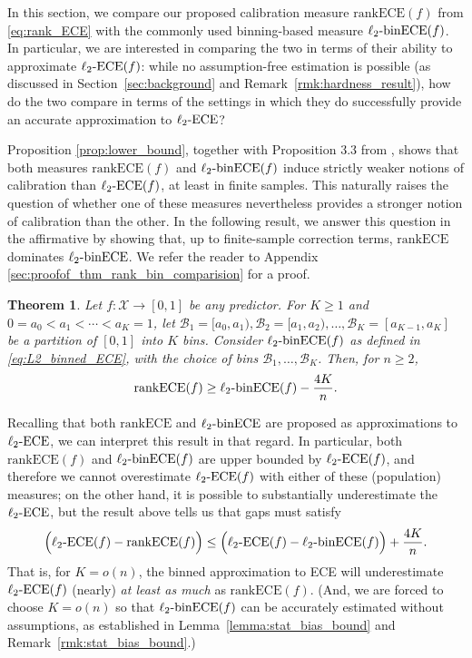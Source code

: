 \documentclass[11pt]{article}
\numberwithin{equation}{section}
\newtheorem{theorem}{Theorem}[section]
\theoremstyle{definition}
\newcommand{\cB}{\mathcal{B}}
\newcommand{\cX}{\mathcal{X}}
\newcommand{\ra}{\rightarrow}
\newcommand{\ECE}{\mathrm{ECE}}
\newcommand{\lECE}{\ell_2\textnormal{-}\ECE}
\newcommand{\binECE}{\mathrm{binECE}}
\newcommand{\lbinECE}{\ell_2\textnormal{-}\binECE}
\newcommand{\rankECE}{\mathrm{rankECE}}
\begin{document}
In this section, we compare our proposed calibration measure $\rankECE(f)$ from \eqref{eq:rank_ECE} with the commonly used binning-based measure $\lbinECE(f)$.
In particular, we are interested in comparing the two in terms of their ability to approximate $\lECE(f)$: while no assumption-free estimation is possible (as discussed in Section~\ref{sec:background} and Remark~\ref{rmk:hardness_result}), how do the two compare in terms of the settings in which they do successfully provide an accurate approximation to $\lECE$? 

Proposition \ref{prop:lower_bound}, together with Proposition 3.3 from \cite{kumar2019verified}, shows that both measures $\rankECE(f)$ and $\lbinECE(f)$ induce strictly weaker notions of calibration than $\lECE(f)$, at least in finite samples. This naturally raises the question of whether one of these measures nevertheless provides a stronger notion of calibration than the other. In the following result, we answer this question in the affirmative by showing that, up to finite-sample correction terms, $\rankECE$ dominates $\lbinECE$. We refer the reader to Appendix \ref{sec:proofof_thm_rank_bin_comparision} for a proof.

\begin{theorem}\label{thm:rank_bin_comparison}
Let $f:\cX\ra[0,1]$ be any predictor. For $K\geq 1$ and $0=a_0<a_1<\cdots<a_K=1$, let $\cB_1=[a_0,a_1), \cB_2=[a_1,a_2),\ldots, \cB_K=[a_{K-1},a_K]$ be a partition of $[0,1]$ into $K$ bins. Consider $\lbinECE(f)$ as defined in \eqref{eq:L2_binned_ECE}, with the choice of bins $\cB_1,\ldots,\cB_K$. Then, for $n\geq 2$,
\begin{align*}
    \rankECE(f) \geq \lbinECE(f) - \frac{4K}{n}.
\end{align*}
\end{theorem}

Recalling that both $\rankECE$ and $\lbinECE$ are proposed as approximations to $\lECE$, we can interpret this result in that regard. In particular, both $\rankECE(f)$ and $\lbinECE(f)$ are  upper bounded by $\lECE(f)$, and therefore we cannot overestimate $\lECE(f)$ with either of these (population) measures; on the other hand, it is possible to substantially underestimate the $\lECE$, but the result above tells us that gaps must satisfy
\[\Big(\lECE(f) - \rankECE(f)\Big) \leq \Big(\lECE(f) - \lbinECE(f)\Big)  + \frac{4K}{n}.\]
That is, for $K=o(n)$, the binned approximation to ECE will underestimate $\lECE(f)$ (nearly) \emph{at least as much} as $\rankECE(f)$. (And, we are forced to choose $K=o(n)$ so that $\lbinECE(f)$ can be accurately estimated without assumptions, as established in Lemma~\ref{lemma:stat_bias_bound} and Remark~\ref{rmk:stat_bias_bound}.)
\end{document}
